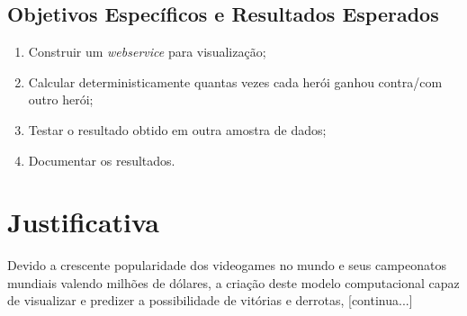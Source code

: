 \subsection{Objetivos Específicos e Resultados Esperados}

\begin{enumerate}
\item Construir um \textit{webservice} para visualização;
\item Calcular deterministicamente quantas vezes cada herói ganhou contra/com outro herói;
\item Testar o resultado obtido em outra amostra de dados;
\item Documentar os resultados.

\end{enumerate}

\section{Justificativa}
Devido a crescente popularidade dos videogames no mundo e seus campeonatos mundiais valendo milhões de dólares, a criação deste modelo computacional capaz de visualizar e predizer a possibilidade de vitórias e derrotas, [continua...]